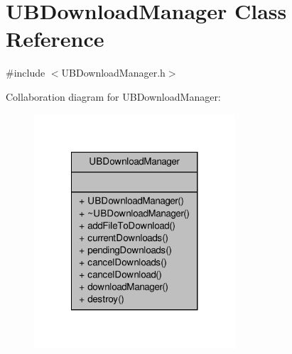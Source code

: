 \hypertarget{class_u_b_download_manager}{\section{U\-B\-Download\-Manager Class Reference}
\label{d7/d38/class_u_b_download_manager}
}


{\ttfamily \#include $<$U\-B\-Download\-Manager.\-h$>$}



Collaboration diagram for U\-B\-Download\-Manager\-:
\nopagebreak
\begin{figure}[H]
\begin{center}
\leavevmode
\includegraphics[width=212pt]{d2/dbf/class_u_b_download_manager__coll__graph}
\end{center}
\end{figure}
